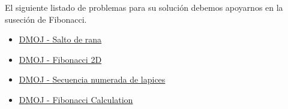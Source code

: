 El siguiente listado de problemas para su solución debemos apoyarnos en la suseción de Fibonacci.

\begin{itemize}
	\item \href{https://dmoj.uclv.edu.cu/problem/frog}{DMOJ - Salto de rana}
	\item \href{https://dmoj.uclv.edu.cu/problem/fibonacci}{DMOJ - Fibonacci 2D}
	\item \href{https://dmoj.uclv.edu.cu/problem/secnum}{DMOJ - Secuencia numerada de lapices}
	\item \href{https://dmoj.uclv.edu.cu/problem/fibonaccicalculatio}{DMOJ - Fibonacci Calculation}
\end{itemize}